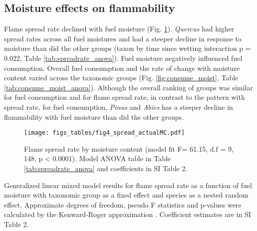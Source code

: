 \documentclass[fire,article,submit,moreauthors,pdftex]{Definitions/mdpi}
\begin{document}
% 


\subsection{Moisture effects on flammability}


Flame spread rate declined with fuel moisture (Fig. \ref{fig:spread_moist}). \emph{Quercus} had higher spread rates across all fuel moistures and had a steeper decline in response to moisture than did the other groups (taxon by time since wetting interaction p = 0.022, Table \ref{tab:spreadrate_anova}). Fuel moisture negatively influenced fuel consumption. Overall fuel consumption and the rate of change with moisture content varied across the taxonomic groups (Fig. \ref{fig:consume_moist}, Table \ref{tab:consume_moist_anova}). Although the overall ranking of groups was similar for fuel consumption and for flame spread rate, in contrast to the pattern with spread rate, for fuel consumption, \emph{Pinus} and \emph{Abies} has a steeper decline in flammability with fuel moisture than did the other groups.

\begin{figure}[H]
  \centering
\texttt{[image: figs\_tables/fig4\_spread\_actualMC.pdf]}
\caption{Flame spread rate by moisture content (model fit F= 61.15, d.f = 9, 148,  p < 0.0001). Model ANOVA table in Table \ref{tab:spreadrate_anova} and coefficients in SI Table 2.}
  \label{fig:spread_moist}
\end{figure}

\begin{table}[H]
  \caption{Generalized linear mixed model results for flame spread rate as a function of fuel moisture with taxonomic group as a fixed effect and species as a nested random effect. Approximate degrees of freedom, pseudo F statistics and p-values were calculated by the Kenward-Roger approximation \cite{Kenward_Roger-1997}. Coefficient estimates are in SI Table 2.}
  \label{tab:spreadrate_anova}
\centering

\end{table}
\end{document}
